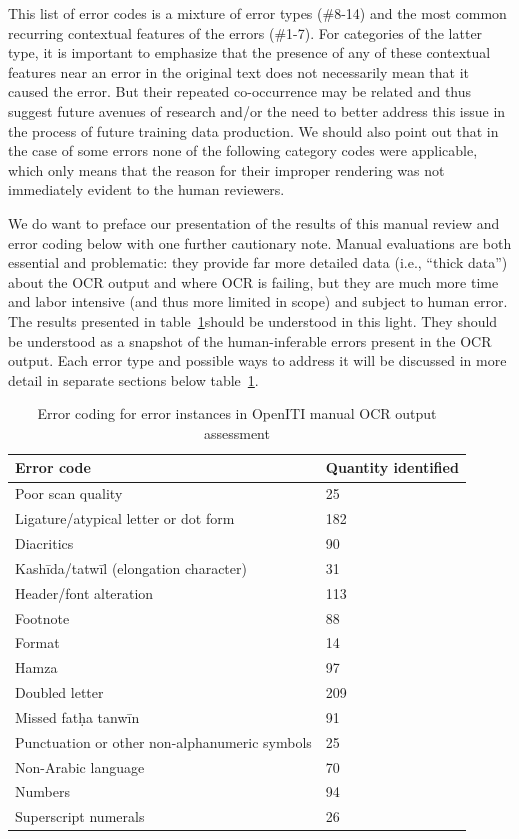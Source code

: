 This list of error codes is a mixture of error types (\#8-14) and the most
common recurring contextual features of the errors (\#1-7). For categories of
the latter type, it is important to emphasize that the presence of any of these
contextual features near an error in the original text does not necessarily
mean that it caused the error. But their repeated co-occurrence may be related
and thus suggest future avenues of research and/or the need to better address
this issue in the process of future training data production. We should also
point out that in the case of some errors none of the following category codes
were applicable, which only means that the reason for their improper rendering
was not immediately evident to the human reviewers. 

We do want to preface our presentation of the results of this manual review and
error coding below with one further cautionary note. Manual evaluations are
both essential and problematic: they provide far more detailed data (i.e.,
“thick data”) about the OCR output and where OCR is failing, but they are much
more time and labor intensive (and thus more limited in scope) and subject to
human error. The results presented in table~\ref{tab_champs:table_3}should be understood in this
light. They should be understood as a snapshot of the human-inferable errors
present in the OCR output. Each error type and possible ways to address it will
be discussed in more detail in separate sections below table~\ref{tab_champs:table_3}.

\begin{table}[h!]
\begin{center}
\caption{Error coding for error instances in OpenITI manual OCR output assessment}
\label{tab_champs:table_3}
\begin{tabularx}{\textwidth}{ll} \toprule
\textbf{Error code} & \textbf{Quantity identified}\\\midrule
Poor scan quality & 25\\
Ligature/atypical letter or dot form & 182\\
Diacritics & 90\\
Kashīda/tatwīl (elongation character)  &31\\
Header/font alteration &113\\
Footnote &88\\
Format &14\\
Hamza &97\\
Doubled letter &209\\
Missed fatḥa tanwīn &91\\
Punctuation or other non-alphanumeric symbols &25\\
Non-Arabic language &70\\
Numbers &94\\
Superscript numerals &26\\
\bottomrule
\end{tabularx}
\end{center}
\end{table}


